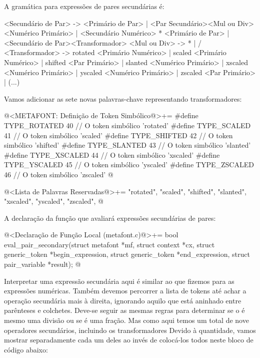 
A gramática para expressões de pares secundárias é:

\alinhaverbatim
<Secundário de Par> -> <Primário de Par> |
                       <Par Secundário><Mul ou Div><Numérico Primário> |
                       <Secundário Numérico> * <Primário de Par> |
                       <Secundário de Par><Transformador>
<Mul ou Div> -> * | /
<Transformador> -> rotated <Primário Numérico> |
                   scaled <Primário Numérico> |
                   shifted <Par Primário> |
                   slanted <Numérico Primário> |
                   xscaled <Numérico Primário> |
                   yscaled <Numérico Primário> |
                   zscaled <Par Primário> | (...)
\alinhanormal

Vamos adicionar as sete novas palavras-chave representando
transformadores:

\iniciocodigo
@<METAFONT: Definição de Token Simbólico@>+=
#define TYPE_ROTATED  40 // O token simbólico 'rotated'
#define TYPE_SCALED   41 // O token simbólico 'scaled'
#define TYPE_SHIFTED  42 // O token simbólico 'shifted'
#define TYPE_SLANTED  43 // O token simbólico 'slanted'
#define TYPE_XSCALED  44 // O token simbólico 'xscaled'
#define TYPE_YSCALED  45 // O token simbólico 'yscaled'
#define TYPE_ZSCALED  46 // O token simbólico 'zscaled'
@
\fimcodigo

\iniciocodigo
@<Lista de Palavras Reservadas@>+=
"rotated", "scaled", "shifted", "slanted", "xscaled", "yscaled",
"zscaled",
@
\fimcodigo

A declaração da função que avaliará expressões secundárias de pares:

\iniciocodigo
@<Declaração de Função Local (metafont.c)@>+=
bool eval_pair_secondary(struct metafont *mf, struct context *cx,
                         struct generic_token *begin_expression,
                         struct generic_token *end_expression,
                         struct pair_variable *result);
@
\fimcodigo


Interpretar uma expressão secundária aqui é similar ao que fizemos
para as expressões numéricas. Também devemos percorrer a lista de
tokens até achar a operação secundária mais à direita, ignorando
aquilo que está aninhado entre parênteses e colchetes. Deve-se seguir
as mesmas regras para determinar se o \monoespaco{/} é mesmo uma
divisão ou se é uma fração. Mas como aqui temos um total de nove
operadores secundários, incluindo os transformadores Devido à
quantidade, vamos mostrar separadamente cada um deles ao invés de
colocá-los todos neste bloco de código abaixo:

